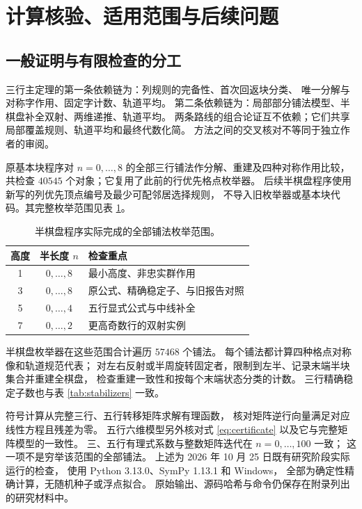 \section{计算核验、适用范围与后续问题}\label{sec:computation}

\subsection{一般证明与有限检查的分工}
三行主定理的第一条依赖链为：列规则的完备性、首次回返块分类、
唯一分解与对称字作用、固定字计数、轨道平均。
第二条依赖链为：局部部分铺法模型、半棋盘补全双射、两维递推、轨道平均。
两条路线的组合论证互不依赖；它们共享局部覆盖规则、轨道平均和最终代数化简。
方法之间的交叉核对不等同于独立作者的审阅。

原基本块程序对 $n=0,\ldots,8$ 的全部三行铺法作分解、重建及四种对称作用比较，
共检查 $40545$ 个对象；它复用了此前的行优先格点枚举器。
后续半棋盘程序使用新写的列优先顶点编号及最少可配邻居选择规则，
不导入旧枚举器或基本块代码。其完整枚举范围见表 \ref{tab:checks}。

\begin{table}[htbp]
\centering
\caption{半棋盘程序实际完成的全部铺法枚举范围。}\label{tab:checks}
\begin{tabular}{ccl}
\toprule
高度 & 半长度 $n$ & 检查重点\\
\midrule
1 & $0,\ldots,8$ & 最小高度、非忠实群作用\\
3 & $0,\ldots,8$ & 原公式、精确稳定子、与旧报告对照\\
5 & $0,\ldots,4$ & 五行显式公式与中线补全\\
7 & $0,\ldots,2$ & 更高奇数行的双射实例\\
\bottomrule
\end{tabular}
\end{table}

半棋盘枚举器在这些范围合计遍历 $57468$ 个铺法。
每个铺法都计算四种格点对称像和轨道规范代表；
对左右反射或半周旋转固定者，限制到左半、记录末端半块集合并重建全棋盘，
检查重建一致性和按每个末端状态分类的计数。
三行精确稳定子数也与表 \ref{tab:stabilizers} 一致。

符号计算从完整三行、五行转移矩阵求解有理函数，
核对矩阵逆行向量满足对应线性方程且残差为零。
五行六维模型另外核对式 \eqref{eq:certificate} 以及它与完整矩阵模型的一致性。
三、五行有理式系数与整数矩阵迭代在 $n=0,\ldots,100$ 一致；
这一项不是穷举该范围的全部铺法。
上述为 2026 年 10 月 25 日既有研究阶段实际运行的检查，
使用 Python 3.13.0、SymPy 1.13.1 和 Windows，
全部为确定性精确计算，无随机种子或浮点拟合。
原始输出、源码哈希与命令仍保存在附录列出的研究材料中。

